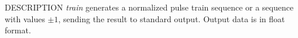% 
% 
% 
% 
%                                                                        
%

\begin{synopsis}
\item[train] [ --l $L$ ] [ --p $P$ ]
\end{synopsis}

\begin{qsection}{DESCRIPTION}
{\em train} generates a normalized pulse train sequence 
or a sequence with values $\pm 1$, 
sending the result to standard output.
Output data is in float format.
\end{qsection}

